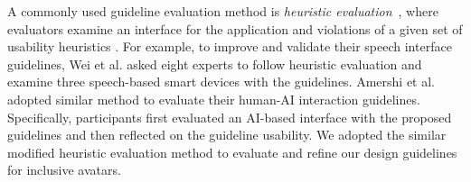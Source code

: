 

 A commonly used guideline evaluation method is \textit{heuristic evaluation}~\cite{nielsen1990heuristic}, where evaluators examine an interface for the application and violations of a given set of usability heuristics \cite{human_ai_guidelines, wei_2018}. For example, to improve and validate their speech interface guidelines, Wei et al. \cite{wei_2018} asked eight experts to follow heuristic evaluation and examine three speech-based smart devices with the guidelines. Amershi et al. \cite{human_ai_guidelines} adopted similar method to evaluate their human-AI interaction guidelines.  %
Specifically, participants first evaluated an AI-based interface with the proposed guidelines and then reflected on the guideline usability. 
We adopted the similar modified heuristic evaluation method to evaluate and refine our design guidelines for inclusive avatars.


